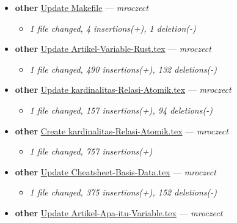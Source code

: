 \begin{itemize}[leftmargin=1.5em]
  \begin{itemize}[leftmargin=1.5em]
    \item \small\textit{1 file changed, 708 insertions(+)}
  \end{itemize}
  \item \textbf{other} \href{https://github.com/mroczect/mroczect.github.io/commit/e7e4a2b9edec88ddea65a34bfc8428f41c2cd73b}{Update Makefile} --- \textit{mroczect}
  \begin{itemize}[leftmargin=1.5em]
    \item \small\textit{1 file changed, 4 insertions(+), 1 deletion(-)}
  \end{itemize}
  \item \textbf{other} \href{https://github.com/mroczect/mroczect.github.io/commit/1a524f588946d45b4c49f56a199c58287ffc0c9b}{Update Artikel-Variable-Rust.tex} --- \textit{mroczect}
  \begin{itemize}[leftmargin=1.5em]
    \item \small\textit{1 file changed, 490 insertions(+), 132 deletions(-)}
  \end{itemize}
  \item \textbf{other} \href{https://github.com/mroczect/mroczect.github.io/commit/78f4a9255ea23c5abaea2b64d843158c51b77b1f}{Update kardinalitas-Relasi-Atomik.tex} --- \textit{mroczect}
  \begin{itemize}[leftmargin=1.5em]
    \item \small\textit{1 file changed, 157 insertions(+), 94 deletions(-)}
  \end{itemize}
  \item \textbf{other} \href{https://github.com/mroczect/mroczect.github.io/commit/73a3e1ed73cb5d8ca58c38b623b9474150ab4e10}{Create kardinalitas-Relasi-Atomik.tex} --- \textit{mroczect}
  \begin{itemize}[leftmargin=1.5em]
    \item \small\textit{1 file changed, 757 insertions(+)}
  \end{itemize}
  \item \textbf{other} \href{https://github.com/mroczect/mroczect.github.io/commit/88fb131f0d566118166db251bad8453d101140fa}{Update Cheatsheet-Basis-Data.tex} --- \textit{mroczect}
  \begin{itemize}[leftmargin=1.5em]
    \item \small\textit{1 file changed, 375 insertions(+), 152 deletions(-)}
  \end{itemize}
  \item \textbf{other} \href{https://github.com/mroczect/mroczect.github.io/commit/f85a4cb870b099ed2c52340e977b27bdd8f458a8}{Update Artikel-Apa-itu-Variable.tex} --- \textit{mroczect}

\end{itemize}
